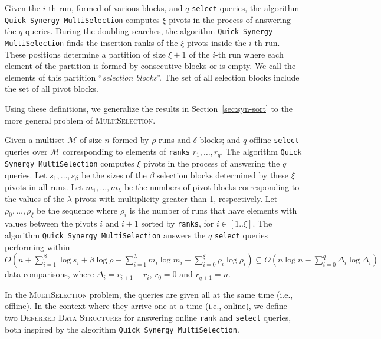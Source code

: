 \begin{INUTILE}
  \begin{definition}
    Given the $i$-th run, formed of various blocks, and $q$
    \texttt{select} queries, the algorithm \texttt{Quick Synergy
      MultiSelection} computes $\xi$ pivots in the process of
    answering the $q$ queries. During the doubling searches, the
    algorithm \texttt{Quick Synergy MultiSelection} finds the
    insertion ranks of the $\xi$ pivots inside the $i$-th run. These
    positions determine a partition of size $\xi+1$ of the $i$-th run
    where each element of the partition is formed by consecutive
    blocks or is empty. We call the elements of this partition
    ``\emph{selection blocks}''. The set of all selection blocks
    include the set of all pivot blocks.
  \end{definition}

Using these definitions, we generalize the results in Section~\ref{sec:syn-sort} to the more general problem of \textsc{MultiSelection}.

\begin{theorem}\label{theo:qsms}
  Given a multiset $\mathcal{M}$ of size $n$ formed by $\rho$ runs and
  $\delta$ blocks; and $q$ offline \texttt{select} queries over
  $\mathcal{M}$ corresponding to elements of \texttt{ranks}
  $r_1, \dots, r_q$. The algorithm \texttt{Quick Synergy
    MultiSelection} computes $\xi$ pivots in the process of answering
  the $q$ queries. Let $s_1,\dots, s_{\beta}$ be the sizes of the
  $\beta$ selection blocks determined by these $\xi$ pivots in all
  runs. Let $m_1, \dots, m_\lambda$ be the numbers of pivot blocks
  corresponding to the values of the $\lambda$ pivots with
  multiplicity greater than 1, respectively.  Let
  $\rho_0, \dots, \rho_\xi$ be the sequence where $\rho_i$ is the
  number of runs that have elements with values between the pivots $i$
  and $i+1$ sorted by \texttt{ranks}, for $i\in[1..\xi]$.  The
  algorithm \texttt{Quick Synergy MultiSelection} answers the $q$
  \texttt{select} queries performing within
  $O(n + \sum^{\beta}_{i=1}\log{s_i} +
    \beta\log{\rho}-\sum^{\lambda}_{i=1}m_i\log{m_i} -
    \sum^{\xi}_{i=0}\rho_i\log{\rho_i}) \subseteq
  O(n\log{n} - \sum^{q}_{i=0}\Delta_i\log{\Delta_i})$ data
  comparisons, where $\Delta_i = r_{i+1} - r_i$, $r_0=0$ and
  $r_{q+1}=n$.
\end{theorem}
\end{INUTILE}

In the \textsc{MultiSelection} problem, the queries are given all at the same time (i.e.,
offline). In the context where they arrive one at a time (i.e., online), we define
two \textsc{Deferred Data Structures} for answering online
\texttt{rank} and \texttt{select} queries, both inspired by the algorithm
\texttt{Quick Synergy MultiSelection}.

